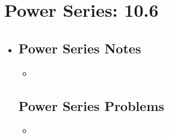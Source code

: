 \section{Power Series: 10.6}
\begin{itemize}
  \item[]

  \subsection{Power Series Notes}
  \begin{itemize}
    \item
  \end{itemize}

  \subsection{Power Series Problems}
  \begin{itemize}
    \item
  \end{itemize}

\end{itemize}
